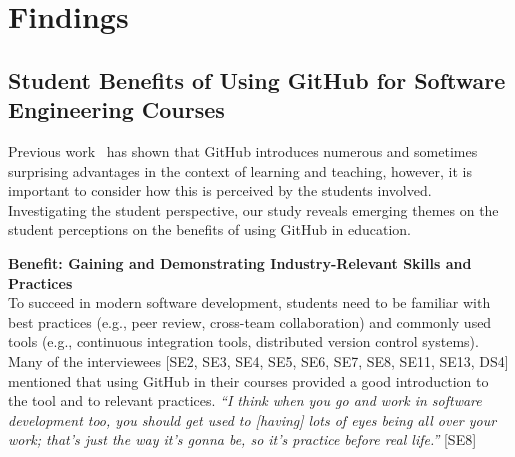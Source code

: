 \section{Findings} %
\label{sec:Findings}


\subsection{Student Benefits of Using GitHub for Software Engineering Courses}
Previous work~\cite{zagalsky2015emergence} has shown that GitHub introduces numerous and sometimes surprising advantages in the context of learning and teaching, however, it is important to consider how this is perceived by the students involved. Investigating the student perspective, our study reveals emerging themes on the student perceptions on the benefits of using GitHub in education.


\textbf{Benefit: Gaining and Demonstrating Industry-Relevant Skills and Practices}\\
To succeed in modern software development, students need to be familiar with best practices (e.g., peer review, cross-team collaboration) and commonly used tools (e.g., continuous integration tools, distributed version control systems). Many of the interviewees [SE2, SE3, SE4, SE5, SE6, SE7, SE8, SE11, SE13, DS4] mentioned that using GitHub in their courses provided a good introduction to the tool and to relevant practices. \textit{``I think when you go and work in software development too, you should get used to [having] lots of eyes being all over your work; that's just the way it's gonna be, so it's practice before real life.''} [SE8]

